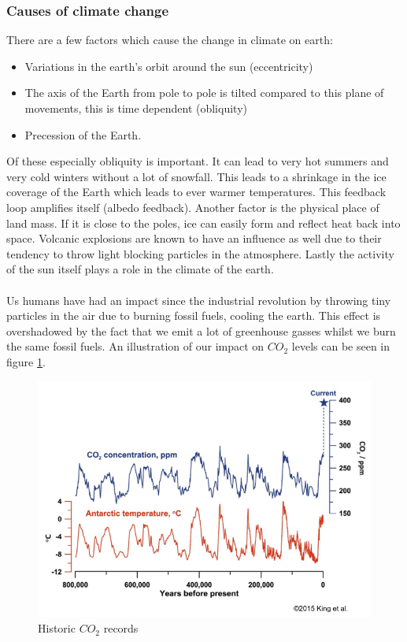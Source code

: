 \documentclass[../summary.tex]{subfiles}
\begin{document}
			\subsubsection{Causes of climate change}
				There are a few factors which cause the change in climate on earth:
				\begin{itemize}
					\item Variations in the earth's orbit around the sun (eccentricity)
					\item The axis of the Earth from pole to pole is tilted compared to this plane of movements, this is time dependent (obliquity)
					\item Precession of the Earth. 
				\end{itemize}
				Of these especially obliquity is important. It can lead to very hot summers and very cold winters without a lot of snowfall. This leads to a shrinkage in the ice coverage of the Earth which leads to ever warmer temperatures. This feedback loop amplifies itself (albedo feedback). Another factor is the physical place of land mass. If it is close to the poles, ice can easily form and reflect heat back into space. Volcanic explosions are known to have an influence as well due to their tendency to throw light blocking particles in the atmosphere. Lastly the activity of the sun itself plays a role in the climate of the earth. \\
				\\
				Us humans have had an impact since the industrial revolution by throwing tiny particles in the air due to burning fossil fuels, cooling the earth. This effect is overshadowed by the fact that we emit a lot of greenhouse gasses whilst we burn the same fossil fuels. An illustration of our impact on $CO_2$ levels can be seen in figure \ref{fig:1-co2-history}.
				\begin{figure}[h]
					\centering
					\includegraphics[width=0.7\linewidth]{../images/1-co2-history.png}
					\caption{Historic $CO_2$ records}
					\label{fig:1-co2-history}
				\end{figure}
				
\end{document}
